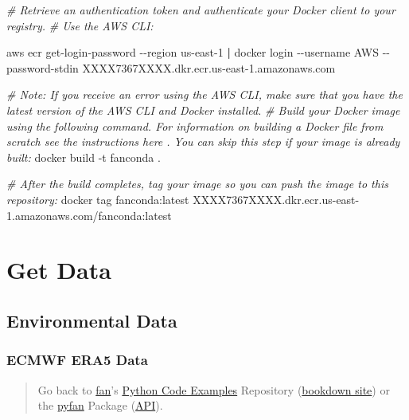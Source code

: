 \documentclass[
]{book}
\newenvironment{Shaded}{\begin{snugshade}}{\end{snugshade}}
\newcommand{\CommentTok}[1]{\textcolor[rgb]{0.56,0.35,0.01}{\textit{#1}}}
\newcommand{\ExtensionTok}[1]{#1}
\newcommand{\KeywordTok}[1]{\textcolor[rgb]{0.13,0.29,0.53}{\textbf{#1}}}
\newcommand{\NormalTok}[1]{#1}
\begin{document}
\begin{Shaded}
\begin{Highlighting}[]
\CommentTok{\# Retrieve an authentication token and authenticate your Docker client to your registry.}
\CommentTok{\# Use the AWS CLI:}

\ExtensionTok{aws}\NormalTok{ ecr get{-}login{-}password {-}{-}region us{-}east{-}1 }\KeywordTok{|} \ExtensionTok{docker}\NormalTok{ login {-}{-}username AWS {-}{-}password{-}stdin XXXX7367XXXX.dkr.ecr.us{-}east{-}1.amazonaws.com}

\CommentTok{\# Note: If you receive an error using the AWS CLI, make sure that you have the latest version of the AWS CLI and Docker installed.}
\CommentTok{\# Build your Docker image using the following command. For information on building a Docker file from scratch see the instructions here . You can skip this step if your image is already built:}
\ExtensionTok{docker}\NormalTok{ build {-}t fanconda .}

\CommentTok{\# After the build completes, tag your image so you can push the image to this repository:}
\ExtensionTok{docker}\NormalTok{ tag fanconda:latest XXXX7367XXXX.dkr.ecr.us{-}east{-}1.amazonaws.com/fanconda:latest}
\end{Highlighting}
\end{Shaded}

\hypertarget{get-data}{%
\chapter{Get Data}\label{get-data}}

\hypertarget{environmental-data}{%
\section{Environmental Data}\label{environmental-data}}

\hypertarget{ecmwf-era5-data}{%
\subsection{ECMWF ERA5 Data}\label{ecmwf-era5-data}}

\begin{quote}
Go back to \href{http://fanwangecon.github.io/}{fan}'s \href{https://fanwangecon.github.io/Py4Econ/}{Python Code Examples} Repository (\href{https://fanwangecon.github.io/Py4Econ/bookdown}{bookdown site}) or the \href{https://pyfan.readthedocs.io/en/latest/}{pyfan} Package (\href{https://pyfan.readthedocs.io/en/latest/reference.html}{API}).
\end{quote}
\end{document}
